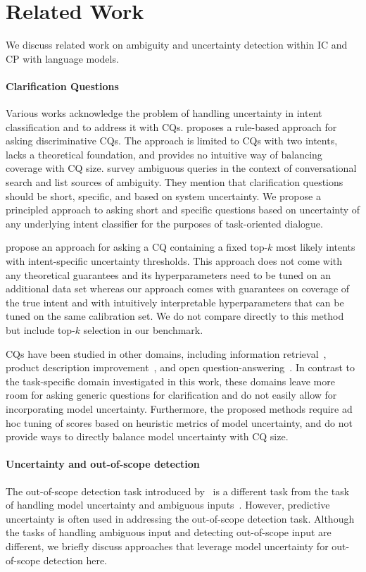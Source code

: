 \documentclass[11pt]{article}
\begin{document}
\section{Related Work}
\label{sec:related_work}
We discuss related work on ambiguity and uncertainty detection within IC and CP with language models.

\paragraph{Clarification Questions}
Various works acknowledge the problem of handling uncertainty in intent classification and to address it with CQs. \citet{dhole2020resolving} proposes a rule-based approach for asking discriminative CQs. The approach is limited to CQs with two intents, lacks a theoretical foundation, and provides no intuitive way of balancing coverage with CQ size. \citet{keyvan2022approach} survey ambiguous queries in the context of conversational search and list sources of ambiguity. They mention that clarification questions should be short, specific, and based on system uncertainty. We propose a principled approach to asking short and specific questions based on uncertainty of any underlying intent classifier for the purposes of task-oriented dialogue.

\citet{alfieri2022intent} propose an approach for asking a CQ containing a fixed top-$k$ most likely intents with intent-specific uncertainty thresholds. This approach does not come with any theoretical guarantees and its hyperparameters need to be tuned on an additional data set whereas our approach comes with guarantees on coverage of the true intent and with intuitively interpretable hyperparameters that can be tuned on the same calibration set. We do not compare directly to this method but include top-$k$ selection in our benchmark.

CQs have been studied in other domains, including information retrieval~\cite{zamani2020generating}, product description improvement~\cite{zhang2021diverse}, and open question-answering~\cite{kuhn2022clam}. In contrast to the task-specific domain investigated in this work, these domains leave more room for asking generic questions for clarification and do not easily allow for incorporating model uncertainty. Furthermore, the proposed methods require ad hoc tuning of scores based on heuristic metrics of model uncertainty, and do not provide ways to directly balance model uncertainty with CQ size.

\paragraph{Uncertainty and out-of-scope detection}
The out-of-scope detection task introduced by~\citet{larson-etal-2019-evaluation} is a different task from the task of handling model uncertainty and ambiguous inputs~\citep{cavalin2020improving,yilmaz2020kloos,zhan2021out,zhou2021contrastive}. However, predictive uncertainty is often used in addressing the out-of-scope detection task. Although the tasks of handling ambiguous input and detecting out-of-scope input are different, we briefly discuss approaches that leverage model uncertainty for out-of-scope detection here.
\end{document}
